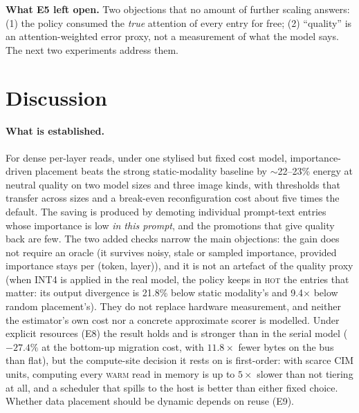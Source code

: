 \documentclass[10pt,a4paper]{article}
\newcommand{\hot}{\textsc{hot}}
\newcommand{\warm}{\textsc{warm}}
\begin{document}
\textbf{What E5 left open.} Two objections that no amount of further scaling answers: (1) the policy consumed the \emph{true} attention of every entry for free; (2) ``quality'' is an attention-weighted error proxy, not a measurement of what the model says. The next two experiments address them.







\section{Discussion}
\paragraph{What is established.} For dense per-layer reads, under one stylised but fixed cost model, importance-driven placement beats the strong static-modality baseline by $\sim$22--23\% energy at neutral quality on two model sizes and three image kinds, with thresholds that transfer across sizes and a break-even reconfiguration cost about five times the default. The saving is produced by demoting individual prompt-text entries whose importance is low \emph{in this prompt}, and the promotions that give quality back are few. The two added checks narrow the main objections: the gain does not require an oracle (it survives noisy, stale or sampled importance, provided importance stays per (token, layer)), and it is not an artefact of the quality proxy (when INT4 is applied in the real model, the policy keeps in \hot{} the entries that matter: its output divergence is 21.8\% below static modality's and 9.4$\times$ below random placement's). They do not replace hardware measurement, and neither the estimator's own cost nor a concrete approximate scorer is modelled. Under explicit resources (E8) the result holds and is stronger than in the serial model ($-27.4\%$ at the bottom-up migration cost, with $11.8\times$ fewer bytes on the bus than flat), but the compute-site decision it rests on is first-order: with scarce CIM units, computing every \warm{} read in memory is up to $5\times$ slower than not tiering at all, and a scheduler that spills to the host is better than either fixed choice. Whether data placement should be dynamic depends on reuse (E9).
\end{document}

